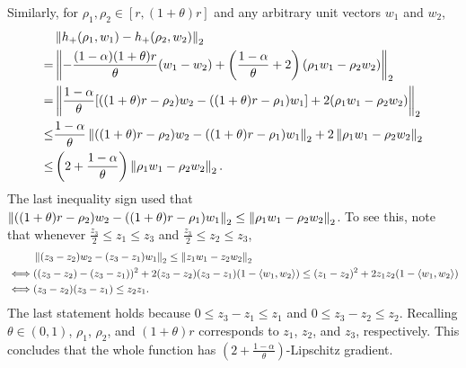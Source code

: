 Similarly, for $\rho_1, \rho_2 \in [r,(1+\theta)r]$ and any arbitrary unit vectors $w_1$ and $w_2$,
\begin{align*}
	&\left\|{h_+(\rho_1, w_1) - h_+(\rho_2, w_2)}\right\|_2 \\
	=& 	\left\|{
		- \frac{(1-\alpha)(1+\theta)r}{\theta} (w_1-w_2)
		+ \left ( \frac{1-\alpha}{\theta}+2 \right ) (\rho_1 w_1 - \rho_2 w_2)
	}\right\|_2\\
	=& 	\left\|{
		\frac{1-\alpha}{\theta} [((1+\theta)r-\rho_2)w_2-((1+\theta)r-\rho_1)w_1]
		+ 2 (\rho_1 w_1 - \rho_2 w_2)
	}\right\|_2\\
	\leq& \frac{1-\alpha}{\theta} \left\|{((1+\theta)r-\rho_2) w_2-((1+\theta)r-\rho_1)w_1}\right\|_2 + 2 \left\|{\rho_1 w_1 - \rho_2 w_2}\right\|_2\\
	\leq& \left ( 2+\frac{1-\alpha}{\theta} \right ) \left\|{\rho_1 w_1 - \rho_2 w_2}\right\|_2.
\end{align*}
The last inequality sign used that $\left\|{((1+\theta)r-\rho_2) w_2-((1+\theta)r-\rho_1)w_1}\right\|_2 \leq \left\|{\rho_1 w_1 - \rho_2 w_2}\right\|_2$.
To see this, note that whenever $\frac{z_3}{2} \leq z_1 \leq z_3$ and $\frac{z_3}{2} \leq z_2 \leq z_3$,
\begin{align*}
	&\left\|{(z_3-z_2) w_2-(z_3-z_1)w_1}\right\|_2 \leq \left\|{z_1 w_1 - z_2 w_2}\right\|_2\\
	\iff & ((z_3-z_2)-(z_3-z_1))^2 + 2(z_3-z_2)(z_3-z_1)(1-\langle w_1,w_2\rangle) \leq (z_1-z_2)^2 + 2 z_1 z_2 (1-\langle w_1,w_2\rangle)\\
	\iff & (z_3-z_2)(z_3-z_1) \leq z_2 z_1.
\end{align*}
The last statement holds because $0 \leq z_3-z_1 \leq z_1$ and $0 \leq z_3-z_2 \leq z_2$.
Recalling $\theta \in (0,1)$, $\rho_1$, $\rho_2$, and $(1+\theta)r$ corresponds to $z_1$, $z_2$, and $z_3$, respectively.
This concludes that the whole function has $\left ( 2+\frac{1-\alpha}{\theta} \right )$-Lipschitz gradient.

